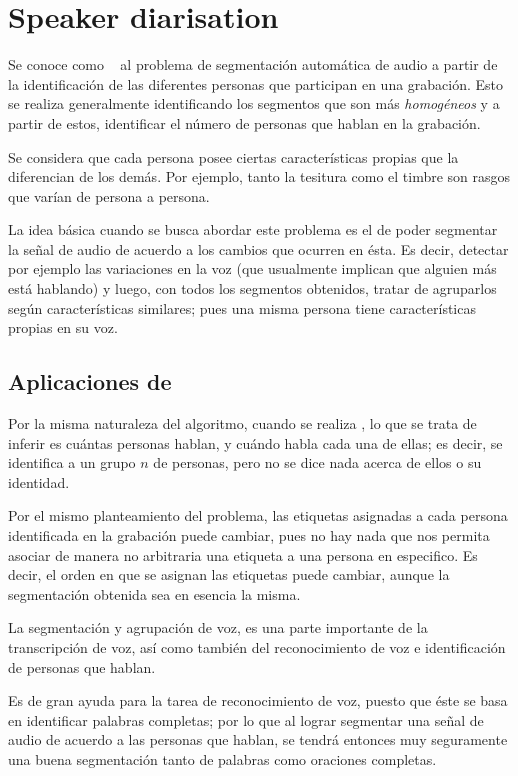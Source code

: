 
\chapter{Speaker diarisation}\label{ch:chap5}

Se conoce como \SD~ al problema de segmentación automática de audio a partir de la identificación de las diferentes personas que participan en una grabación. Esto se realiza generalmente identificando los segmentos que son más \textit{homogéneos} y a partir de estos, identificar el número de personas que hablan en la grabación.

Se considera que cada persona posee ciertas características propias que la diferencian de los demás. Por ejemplo, tanto la tesitura como el timbre son rasgos que varían de persona a persona.

La idea básica cuando se busca abordar este problema es el de poder segmentar la señal de audio de acuerdo a los cambios que ocurren en ésta. Es decir, detectar por ejemplo las variaciones en la voz (que usualmente implican que alguien más está hablando) y luego, con todos los segmentos obtenidos, tratar de agruparlos según características similares; pues una misma persona tiene características propias en su voz. 

\section{Aplicaciones de \sd}

Por la misma naturaleza del algoritmo, cuando se realiza \sd, lo que se trata de inferir es cuántas personas hablan, y cuándo habla cada una de ellas; es decir, se identifica a un grupo $n$ de personas, pero no se dice nada acerca de ellos o su identidad. 

Por el mismo planteamiento del problema, las etiquetas asignadas a cada persona identificada en la grabación puede cambiar, pues no hay nada que nos permita asociar de manera no arbitraria una etiqueta a una persona en especifico. Es decir, el orden en que se asignan las etiquetas puede cambiar, aunque la segmentación obtenida sea en esencia la misma.

La segmentación y agrupación de voz, es una parte importante de la transcripción de voz, así como también del reconocimiento de voz e identificación de personas que hablan. 

Es de gran ayuda para la tarea de reconocimiento de voz, puesto que éste se basa en identificar palabras completas; por lo que al lograr segmentar una señal de audio de acuerdo a las personas que hablan, se tendrá entonces muy seguramente una buena segmentación tanto de palabras como oraciones completas.

